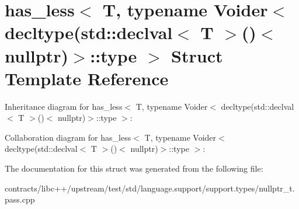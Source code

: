 \hypertarget{structhas__less_3_01_t_00_01typename_01_voider_3_01decltype_07std_1_1declval_3_01_t_01_4_07_08_3_01nullptr_08_4_1_1type_01_4}{}\section{has\+\_\+less$<$ T, typename Voider$<$ decltype(std\+:\+:declval$<$ T $>$()$<$ nullptr)$>$\+:\+:type $>$ Struct Template Reference}
\label{structhas__less_3_01_t_00_01typename_01_voider_3_01decltype_07std_1_1declval_3_01_t_01_4_07_08_3_01nullptr_08_4_1_1type_01_4}


Inheritance diagram for has\+\_\+less$<$ T, typename Voider$<$ decltype(std\+:\+:declval$<$ T $>$()$<$ nullptr)$>$\+:\+:type $>$\+:


Collaboration diagram for has\+\_\+less$<$ T, typename Voider$<$ decltype(std\+:\+:declval$<$ T $>$()$<$ nullptr)$>$\+:\+:type $>$\+:


The documentation for this struct was generated from the following file\+:\begin{DoxyCompactItemize}
\item 
contracts/libc++/upstream/test/std/language.\+support/support.\+types/nullptr\+\_\+t.\+pass.\+cpp\end{DoxyCompactItemize}

